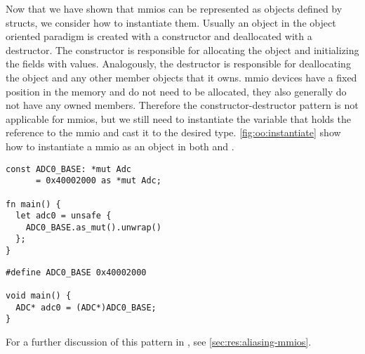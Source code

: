 Now that we have shown that \glspl{mmio} can be represented as objects defined by structs, we consider how to instantiate them.
Usually an object in the object oriented paradigm is created with a constructor and deallocated with a destructor.
The constructor is responsible for allocating the object and initializing the fields with values.
Analogously, the destructor is responsible for deallocating the object and any other member objects that it owns.
\gls{mmio} devices have a fixed position in the memory and do not need to be allocated, they also generally do not have any owned members.
Therefore the constructor-destructor pattern is not applicable for \gls{mmio}s, but we still need to instantiate the variable that holds the reference to the \gls{mmio} and cast it to the desired type.
\autoref{fig:oo:instantiate} show how to instantiate a \gls{mmio} as an object in both {\C} and {\rust}.

\begin{listing}[H]
  \begin{minipage}{0.47\textwidth}
  \begin{listing}
    \begin{verbatim}
const ADC0_BASE: *mut Adc
      = 0x40002000 as *mut Adc;

fn main() {
  let adc0 = unsafe {
    ADC0_BASE.as_mut().unwrap()
  };
}
    \end{verbatim}
    \caption{Rust}
  \end{listing}
  \end{minipage}
  \hfill
  \begin{minipage}{0.47\textwidth}
  \begin{listing}
    \begin{verbatim}
#define ADC0_BASE 0x40002000

void main() {
  ADC* adc0 = (ADC*)ADC0_BASE;
}
    \end{verbatim}
    \caption{C}
  \end{listing}
  \end{minipage}
  \caption{Instantiating a \glspl{mmio}}
  \label{fig:oo:instantiate}
\end{listing}

For a further discussion of this pattern in {\rust}, see \autoref{sec:res:aliasing-mmios}.
